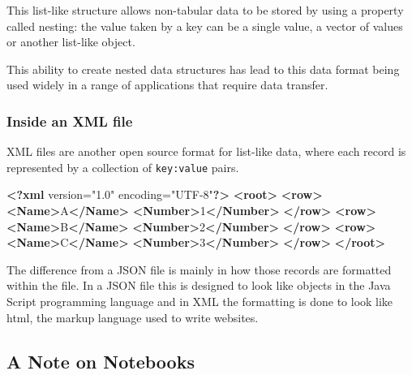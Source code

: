 \documentclass[
  12pt,
]{book}
\newenvironment{Shaded}{\begin{snugshade}}{\end{snugshade}}
\newcommand{\KeywordTok}[1]{\textcolor[rgb]{0.13,0.29,0.53}{\textbf{#1}}}
\newcommand{\NormalTok}[1]{#1}
\begin{document}
This list-like structure allows non-tabular data to be stored by using a property called nesting: the value taken by a key can be a single value, a vector of values or another list-like object.

This ability to create nested data structures has lead to this data format being used widely in a range of applications that require data transfer.

\hypertarget{inside-an-xml-file}{%
\subsubsection{Inside an XML file}\label{inside-an-xml-file}}

XML files are another open source format for list-like data, where each record is represented by a collection of \texttt{key:value} pairs.

\begin{Shaded}
\begin{Highlighting}[]
\KeywordTok{\textless{}?xml}\NormalTok{ version="1.0" encoding="UTF{-}8"}\KeywordTok{?\textgreater{}}
\KeywordTok{\textless{}root\textgreater{}}
  \KeywordTok{\textless{}row\textgreater{}}
    \KeywordTok{\textless{}Name\textgreater{}}\NormalTok{A}\KeywordTok{\textless{}/Name\textgreater{}}
    \KeywordTok{\textless{}Number\textgreater{}}\NormalTok{1}\KeywordTok{\textless{}/Number\textgreater{}}
  \KeywordTok{\textless{}/row\textgreater{}}
  \KeywordTok{\textless{}row\textgreater{}}
    \KeywordTok{\textless{}Name\textgreater{}}\NormalTok{B}\KeywordTok{\textless{}/Name\textgreater{}}
    \KeywordTok{\textless{}Number\textgreater{}}\NormalTok{2}\KeywordTok{\textless{}/Number\textgreater{}}
  \KeywordTok{\textless{}/row\textgreater{}}
  \KeywordTok{\textless{}row\textgreater{}}
    \KeywordTok{\textless{}Name\textgreater{}}\NormalTok{C}\KeywordTok{\textless{}/Name\textgreater{}}
    \KeywordTok{\textless{}Number\textgreater{}}\NormalTok{3}\KeywordTok{\textless{}/Number\textgreater{}}
  \KeywordTok{\textless{}/row\textgreater{}}
\KeywordTok{\textless{}/root\textgreater{}}
\end{Highlighting}
\end{Shaded}

The difference from a JSON file is mainly in how those records are formatted within the file. In a JSON file this is designed to look like objects in the Java Script programming language and in XML the formatting is done to look like html, the markup language used to write websites.

\hypertarget{a-note-on-notebooks}{%
\subsection{A Note on Notebooks}\label{a-note-on-notebooks}}
\end{document}
